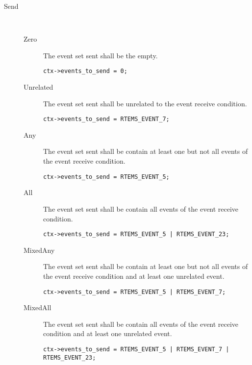 \begin{description}
  \item[Send]~
  \begin{description}
  \item[Zero]
    The event set sent shall be the empty.
\begin{verbatim}
ctx->events_to_send = 0;
\end{verbatim}
  \item[Unrelated]
    The event set sent shall be unrelated to the event receive condition.
\begin{verbatim}
ctx->events_to_send = RTEMS_EVENT_7;
\end{verbatim}
  \item[Any]
    The event set sent shall be contain at least one but not all events of
the event receive condition.
\begin{verbatim}
ctx->events_to_send = RTEMS_EVENT_5;
\end{verbatim}
  \item[All]
    The event set sent shall be contain all events of the event receive condition.
\begin{verbatim}
ctx->events_to_send = RTEMS_EVENT_5 | RTEMS_EVENT_23;
\end{verbatim}
  \item[MixedAny]
    The event set sent shall be contain at least one but not all events of
the event receive condition and at least one unrelated event.
\begin{verbatim}
ctx->events_to_send = RTEMS_EVENT_5 | RTEMS_EVENT_7;
\end{verbatim}
  \item[MixedAll]
    The event set sent shall be contain all events of the event receive
condition and at least one unrelated event.
\begin{verbatim}
ctx->events_to_send = RTEMS_EVENT_5 | RTEMS_EVENT_7 | RTEMS_EVENT_23;
\end{verbatim}
  \end{description}


\end{description}

